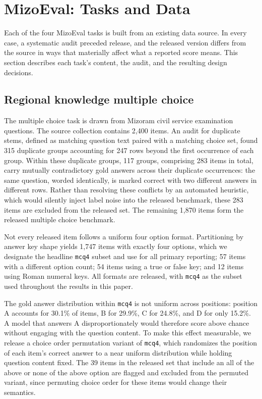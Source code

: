 \documentclass[pdflatex,sn-mathphys-ay]{sn-jnl}
\begin{document}
\section{MizoEval: Tasks and Data}
\label{sec:data}

Each of the four MizoEval tasks is built from an existing data source. In every case, a systematic audit preceded release, and the released version differs from the source in ways that materially affect what a reported score means. This section describes each task's content, the audit, and the resulting design decisions.

\subsection{Regional knowledge multiple choice}
\label{sec:mcq-data}

The multiple choice task is drawn from Mizoram civil service examination questions. The source collection contains 2,400 items. An audit for duplicate stems, defined as matching question text paired with a matching choice set, found 315 duplicate groups accounting for 247 rows beyond the first occurrence of each group. Within these duplicate groups, 117 groups, comprising 283 items in total, carry mutually contradictory gold answers across their duplicate occurrences: the same question, worded identically, is marked correct with two different answers in different rows. Rather than resolving these conflicts by an automated heuristic, which would silently inject label noise into the released benchmark, these 283 items are excluded from the released set. The remaining 1,870 items form the released multiple choice benchmark.

Not every released item follows a uniform four option format. Partitioning by answer key shape yields 1,747 items with exactly four options, which we designate the headline \texttt{mcq4} subset and use for all primary reporting; 57 items with a different option count; 54 items using a true or false key; and 12 items using Roman numeral keys. All formats are released, with \texttt{mcq4} as the subset used throughout the results in this paper.

The gold answer distribution within \texttt{mcq4} is not uniform across positions: position A accounts for 30.1\% of items, B for 29.9\%, C for 24.8\%, and D for only 15.2\%. A model that answers A disproportionately would therefore score above chance without engaging with the question content. To make this effect measurable, we release a choice order permutation variant of \texttt{mcq4}, which randomizes the position of each item's correct answer to a near uniform distribution while holding question content fixed. The 39 items in the released set that include an all of the above or none of the above option are flagged and excluded from the permuted variant, since permuting choice order for these items would change their semantics.
\end{document}
